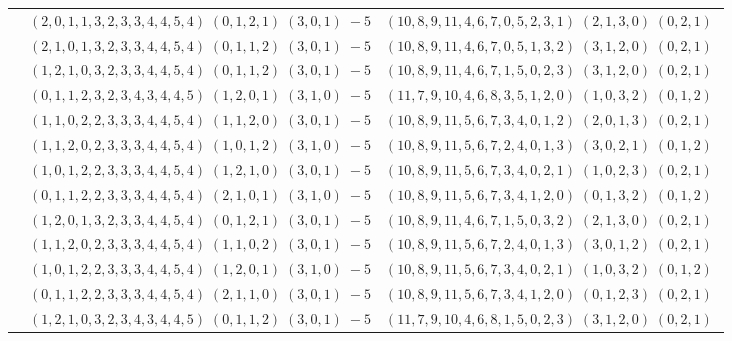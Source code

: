\documentclass[11pt]{article}
\begin{document}
\begin{longtable}[l]{|c|c|c|}
 \cline{2-3} 
 & $(2 ,0 ,1 ,1 ,3 ,2 ,3 ,3 ,4 ,4 ,5 ,4) \;(0 ,1 ,2 ,1) \;(3 ,0 ,1) \;-5$ & $(10 ,8 ,9 ,11 ,4 ,6 ,7 ,0 ,5 ,2 ,3 ,1) \;(2 ,1 ,3 ,0) \;(0 ,2 ,1) \;$\\ 
 \cline{2-3} 
 & $(2 ,1 ,0 ,1 ,3 ,2 ,3 ,3 ,4 ,4 ,5 ,4) \;(0 ,1 ,1 ,2) \;(3 ,0 ,1) \;-5$ & $(10 ,8 ,9 ,11 ,4 ,6 ,7 ,0 ,5 ,1 ,3 ,2) \;(3 ,1 ,2 ,0) \;(0 ,2 ,1) \;$\\ 
 \cline{2-3} 
 & $(1 ,2 ,1 ,0 ,3 ,2 ,3 ,3 ,4 ,4 ,5 ,4) \;(0 ,1 ,1 ,2) \;(3 ,0 ,1) \;-5$ & $(10 ,8 ,9 ,11 ,4 ,6 ,7 ,1 ,5 ,0 ,2 ,3) \;(3 ,1 ,2 ,0) \;(0 ,2 ,1) \;$\\ 
 \cline{2-3} 
 & $(0 ,1 ,1 ,2 ,3 ,2 ,3 ,4 ,3 ,4 ,4 ,5) \;(1 ,2 ,0 ,1) \;(3 ,1 ,0) \;-5$ & $(11 ,7 ,9 ,10 ,4 ,6 ,8 ,3 ,5 ,1 ,2 ,0) \;(1 ,0 ,3 ,2) \;(0 ,1 ,2) \;$\\ 
 \cline{2-3} 
 & $(1 ,1 ,0 ,2 ,2 ,3 ,3 ,3 ,4 ,4 ,5 ,4) \;(1 ,1 ,2 ,0) \;(3 ,0 ,1) \;-5$ & $(10 ,8 ,9 ,11 ,5 ,6 ,7 ,3 ,4 ,0 ,1 ,2) \;(2 ,0 ,1 ,3) \;(0 ,2 ,1) \;$\\ 
 \cline{2-3} 
 & $(1 ,1 ,2 ,0 ,2 ,3 ,3 ,3 ,4 ,4 ,5 ,4) \;(1 ,0 ,1 ,2) \;(3 ,1 ,0) \;-5$ & $(10 ,8 ,9 ,11 ,5 ,6 ,7 ,2 ,4 ,0 ,1 ,3) \;(3 ,0 ,2 ,1) \;(0 ,1 ,2) \;$\\ 
 \cline{2-3} 
 & $(1 ,0 ,1 ,2 ,2 ,3 ,3 ,3 ,4 ,4 ,5 ,4) \;(1 ,2 ,1 ,0) \;(3 ,0 ,1) \;-5$ & $(10 ,8 ,9 ,11 ,5 ,6 ,7 ,3 ,4 ,0 ,2 ,1) \;(1 ,0 ,2 ,3) \;(0 ,2 ,1) \;$\\ 
 \cline{2-3} 
 & $(0 ,1 ,1 ,2 ,2 ,3 ,3 ,3 ,4 ,4 ,5 ,4) \;(2 ,1 ,0 ,1) \;(3 ,1 ,0) \;-5$ & $(10 ,8 ,9 ,11 ,5 ,6 ,7 ,3 ,4 ,1 ,2 ,0) \;(0 ,1 ,3 ,2) \;(0 ,1 ,2) \;$\\ 
 \cline{2-3} 
 & $(1 ,2 ,0 ,1 ,3 ,2 ,3 ,3 ,4 ,4 ,5 ,4) \;(0 ,1 ,2 ,1) \;(3 ,0 ,1) \;-5$ & $(10 ,8 ,9 ,11 ,4 ,6 ,7 ,1 ,5 ,0 ,3 ,2) \;(2 ,1 ,3 ,0) \;(0 ,2 ,1) \;$\\ 
 \cline{2-3} 
 & $(1 ,1 ,2 ,0 ,2 ,3 ,3 ,3 ,4 ,4 ,5 ,4) \;(1 ,1 ,0 ,2) \;(3 ,0 ,1) \;-5$ & $(10 ,8 ,9 ,11 ,5 ,6 ,7 ,2 ,4 ,0 ,1 ,3) \;(3 ,0 ,1 ,2) \;(0 ,2 ,1) \;$\\ 
 \cline{2-3} 
 & $(1 ,0 ,1 ,2 ,2 ,3 ,3 ,3 ,4 ,4 ,5 ,4) \;(1 ,2 ,0 ,1) \;(3 ,1 ,0) \;-5$ & $(10 ,8 ,9 ,11 ,5 ,6 ,7 ,3 ,4 ,0 ,2 ,1) \;(1 ,0 ,3 ,2) \;(0 ,1 ,2) \;$\\ 
 \cline{2-3} 
 & $(0 ,1 ,1 ,2 ,2 ,3 ,3 ,3 ,4 ,4 ,5 ,4) \;(2 ,1 ,1 ,0) \;(3 ,0 ,1) \;-5$ & $(10 ,8 ,9 ,11 ,5 ,6 ,7 ,3 ,4 ,1 ,2 ,0) \;(0 ,1 ,2 ,3) \;(0 ,2 ,1) \;$\\ 
 \cline{2-3} 
 & $(1 ,2 ,1 ,0 ,3 ,2 ,3 ,4 ,3 ,4 ,4 ,5) \;(0 ,1 ,1 ,2) \;(3 ,0 ,1) \;-5$ & $(11 ,7 ,9 ,10 ,4 ,6 ,8 ,1 ,5 ,0 ,2 ,3) \;(3 ,1 ,2 ,0) \;(0 ,2 ,1) \;$\\ 

\end{longtable}
\end{document}

